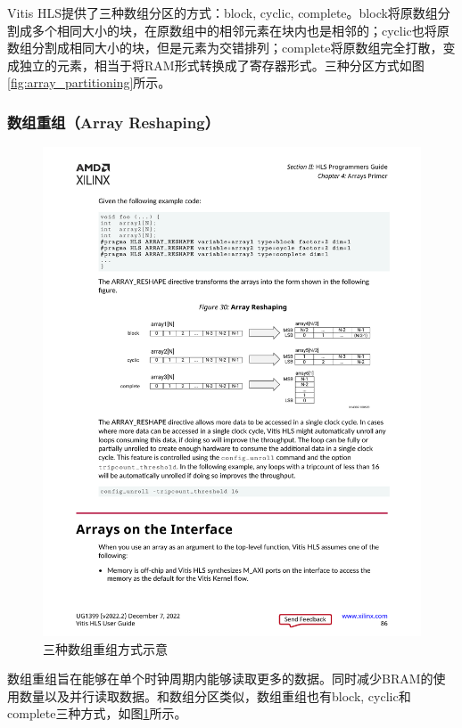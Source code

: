 Vitis HLS提供了三种数组分区的方式：block, cyclic, complete。block将原数组分割成多个相同大小的块，在原数组中的相邻元素在块内也是相邻的；cyclic也将原数组分割成相同大小的块，但是元素为交错排列；complete将原数组完全打散，变成独立的元素，相当于将RAM形式转换成了寄存器形式。三种分区方式如图\ref{fig:array_partitioning}所示。

\subsubsection{数组重组（Array Reshaping）}
\begin{figure}[htbp]
    \centering
    \includegraphics[width=\linewidth]{figures/array_reshaping.pdf}
    \caption{三种数组重组方式示意}
    \label{fig:array_reshaping}
\end{figure}

数组重组旨在能够在单个时钟周期内能够读取更多的数据。同时减少BRAM的使用数量以及并行读取数据\cite{noauthor_vitis_2022}。和数组分区类似，数组重组也有block, cyclic和complete三种方式，如图\ref{fig:array_reshaping}所示。




